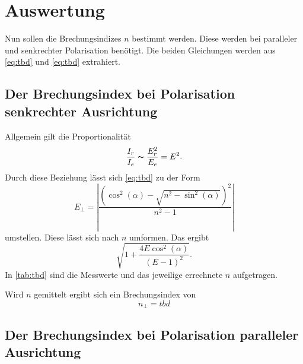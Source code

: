 \section{Auswertung}
\label{sec:Auswertung}

Nun sollen die Brechungsindizes $n$ bestimmt werden.
Diese werden bei paralleler und senkrechter Polarisation benötigt.
Die beiden Gleichungen werden aus \autoref{eq:tbd} und \autoref{eq:tbd} extrahiert.


\subsection{Der Brechungsindex bei Polarisation senkrechter Ausrichtung}

Allgemein gilt die Proportionalität 
\begin{equation}
  \frac{I_r}{I_e} \thicksim \frac{E_r^2}{E_e} = E^2.
\end{equation}
Durch diese Beziehung lässt sich \autoref{eq:tbd} zu der Form
\begin{equation*}
  E_{\perp}=\left|\frac{\left(\cos ^{2}(\alpha) - \sqrt{n^{2}-\sin ^{2}(\alpha)} \right)^{2}}{n^{2}-1}\right|
\end{equation*}
umstellen.
Diese lässt sich nach $n$ umformen.
Das ergibt
\begin{equation}
  \sqrt{1 + \frac{4 E \cos ^2(\alpha)}{(E - 1)^2}}.
\end{equation}
In \autoref{tab:tbd} sind die Messwerte und das jeweilige errechnete $n$ aufgetragen.

Wird $n$ gemittelt ergibt sich ein Brechungsindex von 
\begin{equation*}
  n_{\perp} = tbd
\end{equation*}

\subsection{Der Brechungsindex bei Polarisation paralleler Ausrichtung}
